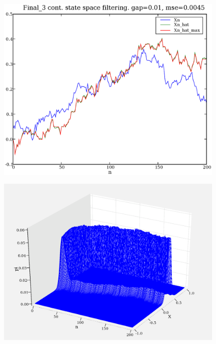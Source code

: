 \documentclass[a4paper,10pt]{article}
\begin{document}
\begin{figure}
\includegraphics[width=1\textwidth]{Final_3_Xn_Xn_hat_Xn_hat_max_gap_0.01.eps}
\caption{}\label{f3}
\end{figure}

\begin{figure}
\includegraphics[width=1\textwidth]{Final_3_3d_pi_FDF.eps}
\caption{}\label{f4}
\end{figure}
\end{document}
